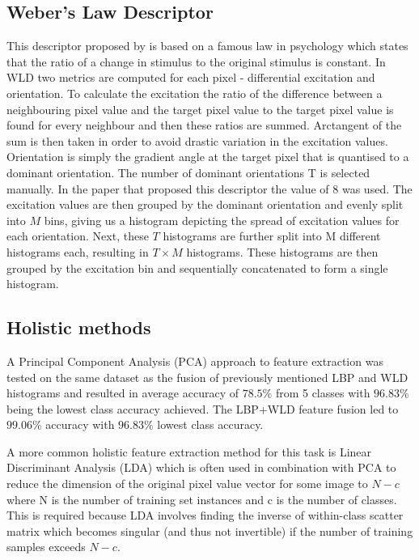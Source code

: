 \subsection{Weber’s Law Descriptor}
This descriptor proposed by \citep{chenj} is based on a famous law in
psychology which states that the ratio of a change in stimulus to the original
stimulus is constant.  In WLD two metrics are computed for each pixel -
differential excitation and orientation.  To calculate the excitation the ratio
of the difference between a neighbouring pixel value and the target pixel value
to the target pixel value is found for every neighbour and then these ratios
are summed. Arctangent of the sum is then taken in order to avoid drastic
variation in the excitation values.  Orientation is simply the gradient angle
at the target pixel that is quantised to a dominant orientation. The number of
dominant orientations T is selected manually. In the paper that proposed this
descriptor the value of 8 was used.  The excitation values are then grouped by
the dominant orientation and evenly split into $M$ bins, giving us a histogram
depicting the spread of excitation values for each orientation. Next, these $T$
histograms are further split into M different histograms each, resulting in $T \times M$
histograms. These histograms are then grouped by the excitation bin and
sequentially concatenated to form a single histogram.  


\subsection{Holistic methods}
A Principal Component Analysis (PCA) approach to feature extraction was tested
on the same dataset as the fusion of previously mentioned LBP and WLD
histograms and resulted in average accuracy of $78.5\%$ from 5 classes with $96.83\%$
being the lowest class accuracy achieved. The LBP+WLD feature fusion led to
$99.06\%$ accuracy with $96.83\%$ lowest class accuracy.  

A more common holistic feature extraction method for this task is Linear
Discriminant Analysis (LDA) which is often used in combination with PCA to
reduce the dimension of the original pixel value vector for some image to $N-c$
where N is the number of training set instances and c is the number of classes.
This is required because LDA involves finding the inverse of within-class
scatter matrix which becomes singular (and thus not invertible) if the number
of training samples exceeds $N-c$.



